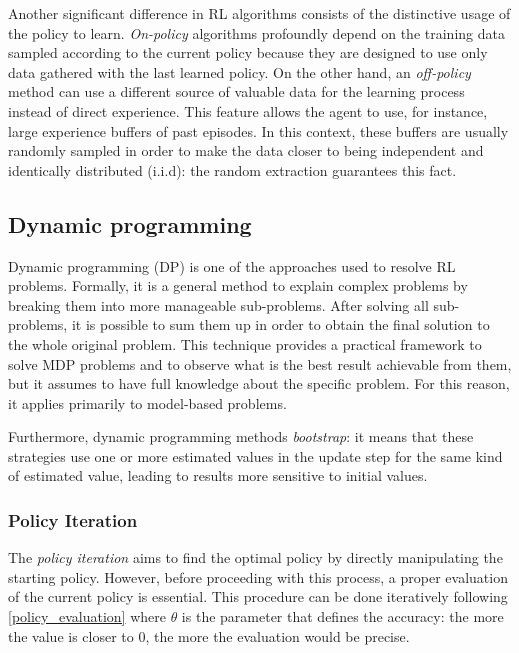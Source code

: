 Another significant difference in RL algorithms consists of the distinctive usage of the policy to learn.
\textit{On-policy} algorithms profoundly depend on the training data sampled according to the current policy because they are designed to use only data gathered with the last learned policy.
On the other hand, an \textit{off-policy} method can use a different source of valuable data for the learning process instead of direct experience.
This feature allows the agent to use, for instance, large experience buffers of past episodes.
In this context, these buffers are usually randomly sampled in order to make the data closer to being independent and identically distributed (i.i.d): the random extraction guarantees this fact.


\subsection{Dynamic programming} \label{dp}

Dynamic programming (DP) is one of the approaches used to resolve RL problems.
Formally, it is a general method to explain complex problems by breaking them into more manageable sub-problems.
After solving all sub-problems, it is possible to sum them up in order to obtain the final solution to the whole original problem.
This technique provides a practical framework to solve MDP problems and to observe what is the best result achievable from them, but it assumes to have full knowledge about the specific problem.
For this reason, it applies primarily to model-based problems.

Furthermore, dynamic programming methods \textit{bootstrap}: it means that these strategies use one or more estimated values in the update step for the same kind of estimated value, leading to results more sensitive to initial values.

\subsubsection{Policy Iteration}

The \textit{policy iteration} aims to find the optimal policy by directly manipulating the starting policy.
However, before proceeding with this process, a proper evaluation of the current policy is essential.
This procedure can be done iteratively following \vref{policy_evaluation} where $\theta$ is the parameter that defines the accuracy: the more the value is closer to $0$, the more the evaluation would be precise.

